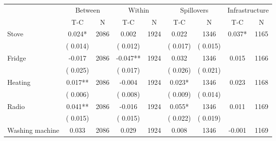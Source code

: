 
\begin{tabular}{l*{8}{c}}\hline&\multicolumn{2}{c}{Between}&\multicolumn{2}{c}{Within}&\multicolumn{2}{c}{Spillovers}&\multicolumn{2}{c}{Infrastructure}\\ \cmidrule(r){2-3}\cmidrule(l){4-5}\cmidrule(l){6-7}\cmidrule(l){8-9} & {T-C} & {N} & {T-C} & {N}  & {T-C}  & {N} & {T-C}  & {N} \\ \midrule
Stove        &              0.024*      &       2086       &              0.002      &       1924       &              0.022      &       1346  &        0.037* &       1165       \\
                       &       (       0.014)            &                               &       (       0.012)            &                               &       (       0.017)            &       (       0.015) &                  \\
Fridge        &             -0.017      &       2086       &             -0.047**      &       1924       &              0.032      &       1346  &        0.015 &       1166       \\
                       &       (       0.025)            &                               &       (       0.017)            &                               &       (       0.026)            &       (       0.021) &                  \\
Heating        &              0.017**      &       2086       &             -0.004      &       1924       &              0.023*      &       1346  &        0.023 &       1168       \\
                       &       (       0.006)            &                               &       (       0.008)            &                               &       (       0.009)            &       (       0.014) &                  \\
Radio        &              0.041**      &       2086       &             -0.016      &       1924       &              0.055*      &       1346  &        0.011 &       1169       \\
                       &       (       0.015)            &                               &       (       0.015)            &                               &       (       0.022)            &       (       0.019) &                  \\
Washing machine        &              0.033      &       2086       &              0.029      &       1924       &              0.008      &       1346  &       -0.001 &       1169       \\

\end{tabular}

